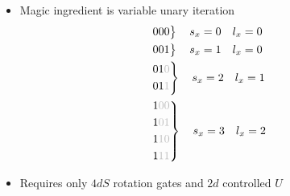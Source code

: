 \documentclass{beamer}
\begin{document}
\begin{frame}
\begin{itemize}
    \item Magic ingredient is variable unary iteration \cite{Sanders_2020}
        \small
    \[
    \begin{aligned}
        &\left.
        \begin{aligned}
        &000 \\
        \end{aligned}
        \right\} \quad s_x=0 \quad l_x = 0&\\
        &\left.
        \begin{aligned}
        &001 \\
        \end{aligned}
        \right\} \quad s_x=1 \quad l_x = 0&\\
        &\left.
        \begin{aligned}
        &01{\textcolor{lightgray}{0}} \\
        &01{\textcolor{lightgray}{1}} 
        \end{aligned}
        \right\} \quad s_x=2 \quad l_x = 1&\\
        &\left.\begin{aligned}
            &1{\textcolor{lightgray}{00}} \\
            &1{\textcolor{lightgray}{01}} \\
            &1{\textcolor{lightgray}{10}} \\
            &1{\textcolor{lightgray}{11}}
        \end{aligned}
        \right\} \quad s_x=3 \quad l_x = 2&\\
    \end{aligned}
    \]
    \normalsize
    \par\noindent
    \item Requires only $4dS$ rotation gates and $2d$ controlled $U$

    
\end{itemize}
\end{frame}
    
\end{document}
